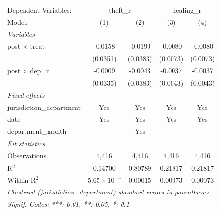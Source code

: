 \begingroup
\centering
\begin{tabular}{lcccc}
   \tabularnewline \midrule \midrule
   Dependent Variables: & \multicolumn{2}{c}{theft\_r} & \multicolumn{2}{c}{dealing\_r}\\
   Model:                    & (1)                   & (2)      & (3)      & (4)\\  
   \midrule
   \emph{Variables}\\
   post $\times$ treat       & -0.0158               & -0.0199  & -0.0080  & -0.0080\\   
                             & (0.0351)              & (0.0383) & (0.0073) & (0.0073)\\   
   post $\times$ dep\_n      & -0.0009               & -0.0043  & -0.0037  & -0.0037\\   
                             & (0.0335)              & (0.0383) & (0.0043) & (0.0043)\\   
   \midrule
   \emph{Fixed-effects}\\
   jurisdiction\_department  & Yes                   & Yes      & Yes      & Yes\\  
   date                      & Yes                   & Yes      & Yes      & Yes\\  
   department\_month         &                       & Yes      &          & \\  
   \midrule
   \emph{Fit statistics}\\
   Observations              & 4,416                 & 4,416    & 4,416    & 4,416\\  
   R$^2$                     & 0.64700               & 0.80789  & 0.21817  & 0.21817\\  
   Within R$^2$              & $5.65\times 10^{-5}$  & 0.00015  & 0.00073  & 0.00073\\  
   \midrule \midrule
   \multicolumn{5}{l}{\emph{Clustered (jurisdiction\_department) standard-errors in parentheses}}\\
   \multicolumn{5}{l}{\emph{Signif. Codes: ***: 0.01, **: 0.05, *: 0.1}}\\
\end{tabular}
\par\endgroup

